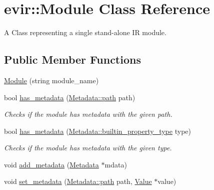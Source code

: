 \hypertarget{classevir_1_1Module}{}\section{evir\+:\+:Module Class Reference}
\label{classevir_1_1Module}


A Class representing a single stand-\/alone IR module.  


\subsection*{Public Member Functions}
\begin{DoxyCompactItemize}
\item 
\hyperlink{classevir_1_1Module_afb986e24396120d52ecd28c793948750}{Module} (string module\+\_\+name)
\item 
\mbox{\label{classevir_1_1Module_a58ff41e503d751030f0caf6bf6eb0f2e}} 
bool \hyperlink{classevir_1_1Module_a58ff41e503d751030f0caf6bf6eb0f2e}{has\+\_\+metadata} (\hyperlink{classevir_1_1Metadata_a0a3a8f0c937238fae5262283bac6286a}{Metadata\+::path} path)
\begin{DoxyCompactList}\small\item\em Checks if the module has metadata with the given path. \end{DoxyCompactList}\item 
\mbox{\label{classevir_1_1Module_a72bdd3953f5ab0d41c5184fffea74107}} 
bool \hyperlink{classevir_1_1Module_a72bdd3953f5ab0d41c5184fffea74107}{has\+\_\+metadata} (\hyperlink{classevir_1_1Metadata_a292423b7a2d93f70382d1da4929f55a0}{Metadata\+::builtin\+\_\+property\+\_\+type} type)
\begin{DoxyCompactList}\small\item\em Checks if the module has metadata with the given type. \end{DoxyCompactList}\item 
void \hyperlink{classevir_1_1Module_a8e8193a7ab86fb626058bd6135f8e2f8}{add\+\_\+metadata} (\hyperlink{classevir_1_1Metadata}{Metadata} $\ast$mdata)
\item 
void \hyperlink{classevir_1_1Module_ab245cceb132496f9c9ce5701158b5bab}{set\+\_\+metadata} (\hyperlink{classevir_1_1Metadata_a0a3a8f0c937238fae5262283bac6286a}{Metadata\+::path} path, \hyperlink{classevir_1_1Value}{Value} $\ast$value)
\item 

\end{DoxyCompactItemize}
